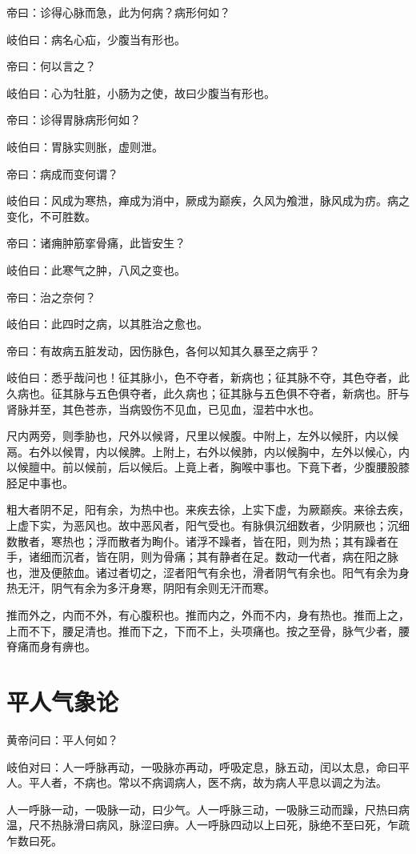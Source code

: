 \documentclass{article}%
\begin{document}
帝曰：诊得心脉而急，此为何病？病形何如？

岐伯曰：病名心疝，少腹当有形也。

帝曰：何以言之？

岐伯曰：心为牡脏，小肠为之使，故曰少腹当有形也。

帝曰：诊得胃脉病形何如？

岐伯曰：胃脉实则胀，虚则泄。

帝曰：病成而变何谓？

岐伯曰：风成为寒热，瘅成为消中，厥成为巅疾，久风为飧泄，脉风成为疠。病之变化，不可胜数。

帝曰：诸痈肿筋挛骨痛，此皆安生？

岐伯曰：此寒气之肿，八风之变也。

帝曰：治之奈何？

岐伯曰：此四时之病，以其胜治之愈也。

帝曰：有故病五脏发动，因伤脉色，各何以知其久暴至之病乎？

岐伯曰：悉乎哉问也！征其脉小，色不夺者，新病也；征其脉不夺，其色夺者，此久病也。征其脉与五色俱夺者，此久病也；征其脉与五色俱不夺者，新病也。肝与肾脉并至，其色苍赤，当病毁伤不见血，已见血，湿若中水也。

尺内两旁，则季胁也，尺外以候肾，尺里以候腹。中附上，左外以候肝，内以候鬲。右外以候胃，内以候脾。上附上，右外以候肺，内以候胸中，左外以候心，内以候膻中。前以候前，后以候后。上竟上者，胸喉中事也。下竟下者，少腹腰股膝胫足中事也。

粗大者阴不足，阳有余，为热中也。来疾去徐，上实下虚，为厥巅疾。来徐去疾，上虚下实，为恶风也。故中恶风者，阳气受也。有脉俱沉细数者，少阴厥也；沉细数散者，寒热也；浮而散者为眴仆。诸浮不躁者，皆在阳，则为热；其有躁者在手，诸细而沉者，皆在阴，则为骨痛；其有静者在足。数动一代者，病在阳之脉也，泄及便脓血。诸过者切之，涩者阳气有余也，滑者阴气有余也。阳气有余为身热无汗，阴气有余为多汗身寒，阴阳有余则无汗而寒。

推而外之，内而不外，有心腹积也。推而内之，外而不内，身有热也。推而上之，上而不下，腰足清也。推而下之，下而不上，头项痛也。按之至骨，脉气少者，腰脊痛而身有痹也。
\section{平人气象论}
黄帝问曰：平人何如？

岐伯对曰：人一呼脉再动，一吸脉亦再动，呼吸定息，脉五动，闰以太息，命曰平人。平人者，不病也。常以不病调病人，医不病，故为病人平息以调之为法。

人一呼脉一动，一吸脉一动，曰少气。人一呼脉三动，一吸脉三动而躁，尺热曰病温，尺不热脉滑曰病风，脉涩曰痹。人一呼脉四动以上曰死，脉绝不至曰死，乍疏乍数曰死。
\end{document}
